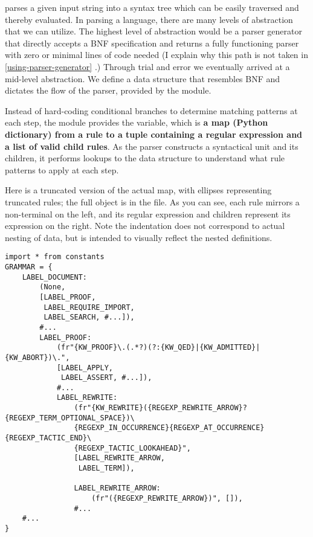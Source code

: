  parses a given input string into a syntax tree which can be easily traversed and thereby evaluated. In parsing a language, there are many levels of abstraction that we can utilize. The highest level of abstraction would be a parser generator that directly accepts a BNF specification and returns a fully functioning parser with zero or minimal lines of code needed (I explain why this path is not taken in \ref{using-parser-generator} .) Through trial and error we eventually arrived at a mid-level abstraction. We define a data structure that resembles BNF and dictates the flow of the parser, provided by the  module.

Instead of hard-coding conditional branches to determine matching patterns at each step, the  module provides the  variable, which is \textbf{a map (Python dictionary) from a rule to a tuple containing a regular expression and a list of valid child rules}. As the parser constructs a syntactical unit and its children, it performs lookups to the data structure to understand what rule patterns to apply at each step.

Here is a truncated version of the actual  map, with ellipses representing truncated rules; the full object is in the  file. As you can see, each rule mirrors a non-terminal on the left, and its regular expression and children  represent its expression on the right. Note the indentation does not correspond to actual nesting of data, but is intended to visually reflect the nested definitions.

\begin{verbatim}
import * from constants
GRAMMAR = {
    LABEL_DOCUMENT: 
        (None,
        [LABEL_PROOF,
         LABEL_REQUIRE_IMPORT,
         LABEL_SEARCH, #...]),
        #...
        LABEL_PROOF: 
            (fr"{KW_PROOF}\.(.*?)(?:{KW_QED}|{KW_ADMITTED}|{KW_ABORT})\.", 
            [LABEL_APPLY,
             LABEL_ASSERT, #...]),
            #...
            LABEL_REWRITE:
                (fr"{KW_REWRITE}({REGEXP_REWRITE_ARROW}?{REGEXP_TERM_OPTIONAL_SPACE})\
                {REGEXP_IN_OCCURRENCE}{REGEXP_AT_OCCURRENCE}{REGEXP_TACTIC_END}\
                {REGEXP_TACTIC_LOOKAHEAD}",
                [LABEL_REWRITE_ARROW,
                 LABEL_TERM]),

                LABEL_REWRITE_ARROW: 
                    (fr"({REGEXP_REWRITE_ARROW})", []),
                #...
    #...
}
\end{verbatim}

